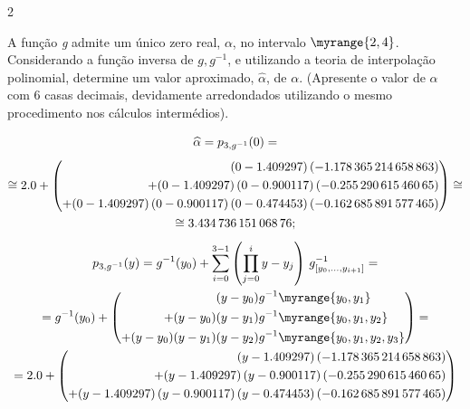 \documentclass["CN_A-Exercises_Resolutions.tex"]{subfiles}
\begin{document}
\begin{questionBox}2{} %

  A função \textit{g} admite um único zero real, \(\alpha\), no intervalo \(\myrange{ 2, 4 }\). Considerando a função inversa de \(g, g^{−1}\), e utilizando a teoria de interpolação polinomial, determine um valor aproximado, \(\widehat{\alpha}\), de \(\alpha\). (Apresente o valor de \(\alpha\) com 6 casas decimais, devidamente arredondados utilizando o mesmo procedimento nos cálculos intermédios).

  \answer{}

  \begin{gather*}
    \widehat{\alpha} 
    = p_{3,g^{-1}}(0)
    = \\[1ex]
    \cong 2.0
    + \left(\begin{aligned}
        (0-1.409297)
        \,(\num{-1.178365214658863})
        \\+ (0-1.409297)
        \,(0-0.900117)
        \,(\num{-0.25529061546065})
        \\+ (0-1.409297)
        \,(0-0.900117)
        \,(0-0.474453)
        \,(\num{-0.162685891577465})
    \end{aligned}\right)
    \cong\\
    \cong\num{3.43473615106876}
    ; \\[1ex]
    p_{3,g^{-1}}(y)
    = g^{-1}(y_0)
    + \sum_{i=0}^{3-1}{
      \left(\prod_{j=0}^{i}{y-y_j}\right)
      \,g^{-1}_{[y_0,\dots,y_{i+1}]}
    }
    = \\
    = g^{-1}(y_0)
    + \left(\begin{aligned}
        (y-y_0)               & g^{-1}\myrange{y_0,y_1}
        \\+ (y-y_0)(y-y_1)        & g^{-1}\myrange{y_0,y_1,y_2}
        \\+ (y-y_0)(y-y_1)(y-y_2) & g^{-1}\myrange{y_0,y_1,y_2,y_3}
    \end{aligned}\right)
    = \\
    = 2.0
    + \left(\begin{aligned}
        (y-1.409297)
        \,(\num{-1.178365214658863})
        \\+ (y-1.409297)
        \,(y-0.900117)
        \,(\num{-0.25529061546065})
        \\+ (y-1.409297)
        \,(y-0.900117)
        \,(y-0.474453)
        \,(\num{-0.162685891577465})
    \end{aligned}\right)
  \end{gather*}


\end{questionBox}
\end{document}
